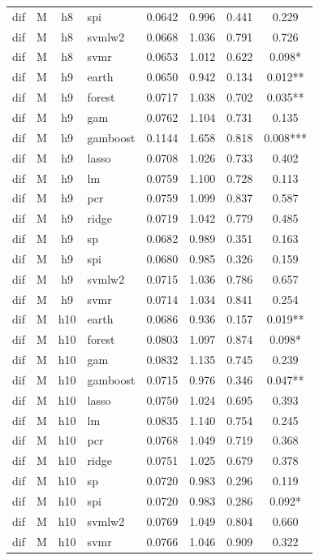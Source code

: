 \begin{ThreePartTable}
\begin{longtable}[t]{llclcccc}
dif & M & h8 & spi & 0.0642 & 0.996 & 0.441 & 0.229\\
dif & M & h8 & svmlw2 & 0.0668 & 1.036 & 0.791 & 0.726\\
dif & M & h8 & svmr & 0.0653 & 1.012 & 0.622 & 0.098*\\
\addlinespace
dif & M & h9 & earth & 0.0650 & 0.942 & 0.134 & 0.012**\\
dif & M & h9 & forest & 0.0717 & 1.038 & 0.702 & 0.035**\\
dif & M & h9 & gam & 0.0762 & 1.104 & 0.731 & 0.135\\
dif & M & h9 & gamboost & 0.1144 & 1.658 & 0.818 & 0.008***\\
dif & M & h9 & lasso & 0.0708 & 1.026 & 0.733 & 0.402\\
dif & M & h9 & lm & 0.0759 & 1.100 & 0.728 & 0.113\\
dif & M & h9 & pcr & 0.0759 & 1.099 & 0.837 & 0.587\\
dif & M & h9 & ridge & 0.0719 & 1.042 & 0.779 & 0.485\\
dif & M & h9 & sp & 0.0682 & 0.989 & 0.351 & 0.163\\
dif & M & h9 & spi & 0.0680 & 0.985 & 0.326 & 0.159\\
dif & M & h9 & svmlw2 & 0.0715 & 1.036 & 0.786 & 0.657\\
dif & M & h9 & svmr & 0.0714 & 1.034 & 0.841 & 0.254\\
\addlinespace
dif & M & h10 & earth & 0.0686 & 0.936 & 0.157 & 0.019**\\
dif & M & h10 & forest & 0.0803 & 1.097 & 0.874 & 0.098*\\
dif & M & h10 & gam & 0.0832 & 1.135 & 0.745 & 0.239\\
dif & M & h10 & gamboost & 0.0715 & 0.976 & 0.346 & 0.047**\\
dif & M & h10 & lasso & 0.0750 & 1.024 & 0.695 & 0.393\\
dif & M & h10 & lm & 0.0835 & 1.140 & 0.754 & 0.245\\
dif & M & h10 & pcr & 0.0768 & 1.049 & 0.719 & 0.368\\
dif & M & h10 & ridge & 0.0751 & 1.025 & 0.679 & 0.378\\
dif & M & h10 & sp & 0.0720 & 0.983 & 0.296 & 0.119\\
dif & M & h10 & spi & 0.0720 & 0.983 & 0.286 & 0.092*\\
dif & M & h10 & svmlw2 & 0.0769 & 1.049 & 0.804 & 0.660\\
dif & M & h10 & svmr & 0.0766 & 1.046 & 0.909 & 0.322\\

\end{longtable}
\end{ThreePartTable}
